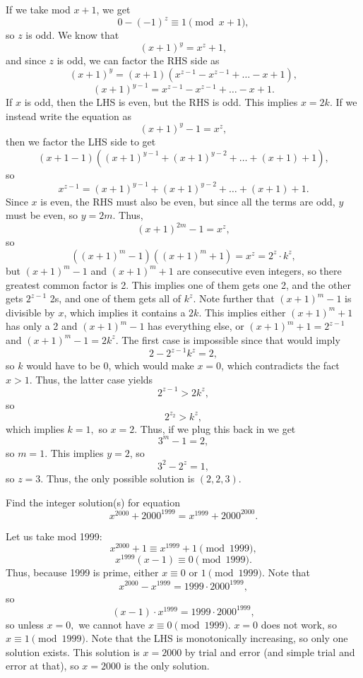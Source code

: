 \documentclass[mast]{lucky}
\begin{document}
\begin{sol}
If we take mod $x+1$, we get
$$0 - (-1)^z \equiv 1 \pmod{x+1},$$
so $z$ is odd. We know that
$$(x+1)^y = x^z+1,$$
and since $z$ is odd, we can factor the RHS side as
$$(x+1)^y = (x+1)(x^{z-1} - x^{z-1} + \ldots - x + 1),$$
$$(x+1)^{y-1} = x^{z-1} - x^{z-1} + \ldots - x + 1.$$
If $x$ is odd, then the LHS is even, but the RHS is odd. This implies $x=2k$. If we instead write the equation as
$$(x+1)^y - 1 = x^z,$$
then we factor the LHS side to get
$$(x+1 - 1)((x+1)^{y-1} + (x+1)^{y-2} + \ldots + (x+1) + 1),$$
so
$$x^{z-1} = (x+1)^{y-1} + (x+1)^{y-2} + \ldots + (x+1) + 1.$$
Since $x$ is even, the RHS must also be even, but since all the terms are odd, $y$ must be even, so $y=2m$. Thus,
$$(x+1)^{2m} - 1 = x^z,$$
so
$$((x+1)^m - 1)((x+1)^m + 1) = x^z = 2^z \cdot k^z,$$
but $(x+1)^m - 1$ and $(x+1)^m + 1$ are consecutive even integers, so there greatest common factor is 2. This implies one of them gets one 2, and the other gets $2^{z-1}$ 2s, and one of them gets all of $k^z$. Note further that $(x+1)^m - 1$ is divisible by $x$, which implies it contains a $2k$. This implies either $(x+1)^m + 1$ has only a 2 and $(x+1)^m - 1$ has everything else, or $(x+1)^m + 1 = 2^{z-1}$ and $(x+1)^m - 1 = 2k^z$. The first case is impossible since that would imply
$$2 - 2^{z-1} k^z = 2,$$
so $k$ would have to be 0, which would make $x=0$, which contradicts the fact $x>1$. Thus, the latter case yields
$$2^{z-1} > 2k^z,$$
so
$$2^{z_2} > k^z,$$
which implies $k=1,$ so $x=2$. Thus, if we plug this back in we get
$$3^m - 1 = 2,$$
so $m=1$. This implies $y=2$, so
$$3^2 - 2^z = 1,$$
so $z=3$. Thus, the only possible solution is $(2,2,3)$. 
\end{sol}
\begin{exam}[Poland MO] 
Find the integer solution(s) for equation 
$$x^{2000} + 2000^{1999} = x^{1999} + 2000^{2000}.$$
\end{exam}
\begin{sol}
Let us take mod 1999:
$$x^{2000} + 1 \equiv x^{1999} + 1 \pmod{1999},$$
$$x^{1999} (x-1) \equiv 0 \pmod{1999}.$$
Thus, because 1999 is prime, either $x \equiv 0$ or $1 \pmod{1999}$. Note that
$$x^{2000} - x^{1999} = 1999 \cdot 2000^{1999},$$
so 
$$(x-1) \cdot x^{1999} = 1999 \cdot 2000^{1999},$$
so unless $x=0,$ we cannot have $x\equiv 0 \pmod{1999}$. $x=0$ does not work, so $x\equiv 1\pmod{1999}$. Note that the LHS is monotonically increasing, so only one solution exists. This solution is $x=2000$ by trial and error (and simple trial and error at that), so $x=2000$ is the only solution.
\end{sol}
\problems
{}
\end{document}
